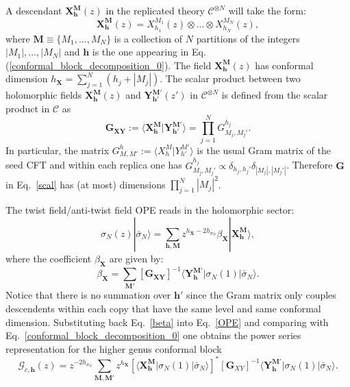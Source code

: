 \documentclass[a4paper,11pt]{article}
\begin{document}
 A descendant $\boldsymbol{X}^{\boldsymbol{M}}_{\boldsymbol{h}}(z)$ in the replicated theory  $\mathcal{C}^{\otimes N}$ will take the form:
 \begin{equation}
 \boldsymbol{X}_{\boldsymbol{h}}^{\boldsymbol{M}}(z)=X_{h_1}^{M_1}(z)\otimes \dots \otimes X_{h_N}^{M_N}(z),
\end{equation}
where $\boldsymbol{M}\equiv\{M_1,\dots,M_N\}$ is a collection of $N$ partitions of the  integers $|M_1|,\dots, |M_N|$ and $\boldsymbol{h}$ is the one appearing in Eq.(\ref{conformal_block_decomposition_0}). The field $\boldsymbol{X}^{\boldsymbol{M}}_{\boldsymbol{h}}(z)$ has  
conformal dimension  $h_{\boldsymbol{\boldsymbol{X}}}=\sum_{j=1}^N(h_j+|M_j|)$. The scalar product between two holomorphic fields $\boldsymbol{X}_{\boldsymbol{h}}^{\boldsymbol{M}}(z)$ and $\boldsymbol{Y}_{\boldsymbol{h}'}^{\boldsymbol{M}'}(z')$ in $\mathcal{C}^{\otimes N}$ is defined from the scalar product in $\mathcal{C}$ as
\begin{equation}
\label{scal}
 \boldsymbol{G}_{\boldsymbol{X}\boldsymbol{Y}}:=\langle \boldsymbol{X}_{\boldsymbol{h}}^{\boldsymbol{M}} | \boldsymbol{Y}_{\boldsymbol{h}'}^{\boldsymbol{M}'}\rangle=\prod_{j=1}^N G^{h_j}_{M_j,M_j'}.
\end{equation}
In particular, the matrix $G^{h}_{M,M'}:=\langle X_{h}^{M}|Y_{h'}^{M'}\rangle$ is the usual Gram matrix of the seed CFT and within each replica  one has $G^{h_j}_{M_j,M_j'}\propto\delta_{h_j,h_j'}\delta_{|M_j|,|M_j'|}$. Therefore $\boldsymbol{G}$ in Eq.~\eqref{scal} has (at most) dimensions  $\prod_{j=1}^{N}|M_j|^2$. 

\noindent   The twist field/anti-twist field OPE reads in the holomorphic sector:
\begin{equation}
\label{OPE}
 \sigma_N(z)|\bar{\sigma}_N\rangle=\sum_{\boldsymbol{h},\boldsymbol{M}} z^{h_{\boldsymbol{X}}-2h_{\sigma_N}}\beta_{\boldsymbol{X}}|\boldsymbol{X}_{\boldsymbol{h}}^{\boldsymbol{M}}\rangle,
\end{equation}
where the coefficient $\beta_{\boldsymbol{X}}$ are given by:
\begin{equation}
\label{beta}
 \beta_{\boldsymbol{X}}=\sum_{\boldsymbol{M}'} [\boldsymbol{G_{\boldsymbol{X}\boldsymbol{Y}}}]^{-1}\langle \boldsymbol{Y}_{\boldsymbol{h}}^{\boldsymbol{M}'}|\sigma_N(1)|\bar{\sigma}_N\rangle.
\end{equation}
Notice that there is no summation over $\boldsymbol{h}'$ since the Gram matrix only couples descendents within each copy that have the same level and same conformal dimension.
Substituting back Eq.~\eqref{beta} into Eq.~\eqref{OPE} and comparing with Eq.~\eqref{conformal_block_decomposition_0} 
one obtains the power series representation for the higher genus conformal block 
\begin{equation}\label{conformal_block_decomposition}
 \mathcal{G}_{c,\boldsymbol{h}}(z)=
 z^{-2h_{\sigma_N}}\sum_{\boldsymbol{M}, \boldsymbol{M}'} z^{h_{\boldsymbol{X}}}[\langle \boldsymbol{X}_{\boldsymbol{h}}^{\boldsymbol{M}}|\sigma_N(1)|\bar{\sigma}_N\rangle]^*[\boldsymbol{G}_{XY}]^{-1}\langle \boldsymbol{Y}_{\boldsymbol{h}}^{\boldsymbol{M}'}| \sigma_N(1)|\bar{\sigma}_N\rangle.
\end{equation}
\end{document}
